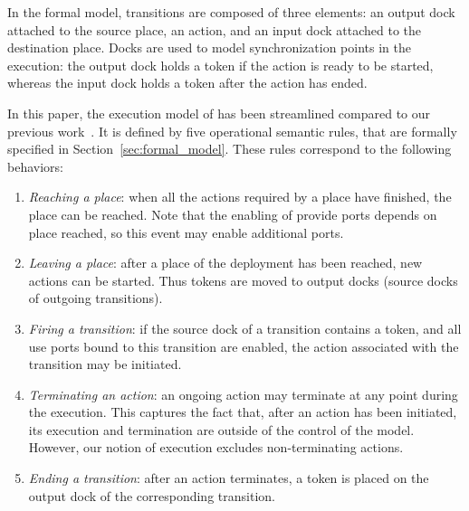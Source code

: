 %
In the formal model, transitions are composed of three elements: an
output dock attached to the source place, an action, and an input dock
attached to the destination place. Docks are used to model
synchronization points in the execution: the output dock holds a token
if the action is ready to be started, whereas the input dock holds a
token after the action has ended.

In this paper, the execution model of \mad has been streamlined
compared to our previous work~\cite{chardet:hal-01858150}. It is
defined by five operational semantic rules, that are formally
specified in Section~\ref{sec:formal_model}. These rules correspond to
the following behaviors:

\begin{enumerate}
\item \emph{Reaching a place}: when all the actions required by a place have finished, the place can be reached. Note that the enabling of provide ports depends on place reached, so this event may enable additional ports.
\item \emph{Leaving a place}: after a place of the deployment has been reached, new actions can be started. Thus tokens are moved to output docks (\ie source docks of outgoing transitions).
\item \emph{Firing a transition}: if the source dock of a transition contains a token, and all use ports bound to this transition are enabled, the action associated with the transition may be initiated.
\item \emph{Terminating an action}: an ongoing action may terminate at any point during the execution. This captures the fact that, after an action has been initiated, its execution and termination are outside of the control of the \mad model. However, our notion of execution excludes non-terminating actions.
\item \emph{Ending a transition}: after an action terminates, a token is placed on the output dock of the corresponding transition.
\end{enumerate}

